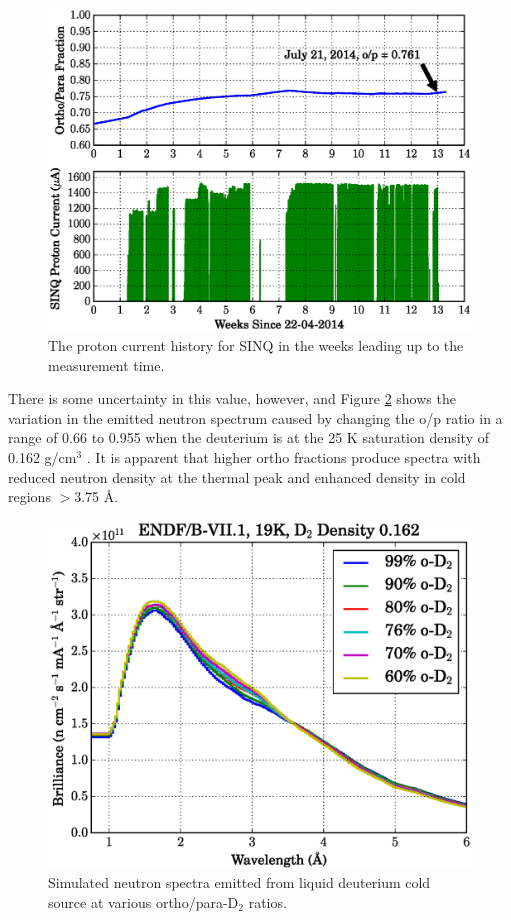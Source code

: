 \documentclass[5p,12pt]{elsarticle}
\begin{document}
\begin{figure}[h!] 
  \centering
    \includegraphics[width=\columnwidth]{graphics/p_current.eps}
     \caption{The proton current history for SINQ in the weeks leading up to the measurement time. \label{fig:p_current}}
\end{figure}

There is some uncertainty in this value, however, and Figure \ref{fig:op_compare} shows the variation in the emitted neutron spectrum caused by changing the o/p ratio in a range of 0.66 to 0.955 when the deuterium is at the 25 K saturation density of 0.162 g/cm$^3$ \cite{bnl_cryo}.  It is apparent that higher ortho fractions produce spectra with reduced neutron density at the thermal peak and enhanced density in cold regions $>$3.75 {\AA}.

\begin{figure}[h!] 
  \centering
    \includegraphics[width=\columnwidth]{graphics/op_compare.eps}
     \caption{Simulated neutron spectra emitted from liquid deuterium cold source at various ortho/para-D$_2$ ratios. \label{fig:op_compare}}
\end{figure}
\end{document}

